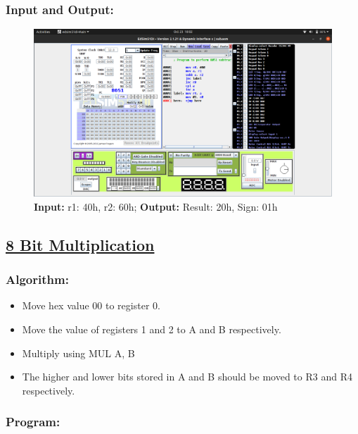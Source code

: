 \documentclass[12pt,a4paper]{article}
\begin{document}
\begin{flushleft}
\subsubsection*{\textbf{Input and Output:}}
\begin{figure}[h]
    \centering
    \includegraphics[trim = 60mm 75mm 60mm 10mm, clip, width = \textwidth]{Pics/Sub.png}
    \caption{ \textbf{Input:} r1: 40h, r2: 60h; 
              \textbf{Output:} Result: 20h, Sign: 01h}
\end{figure}
\newpage
\subsection*{\textbf{\underline{8 Bit Multiplication}}}

\subsubsection*{\textbf{Algorithm:}}
\begin{itemize}
    \item Move hex value 00 to register 0. 
    \item Move the value of registers 1 and 2 to A and B respectively.
    \item Multiply using MUL A, B
    \item The higher and lower bits stored in A and B should be moved to R3 and R4 respectively.
\end{itemize}

\newpage
\subsubsection*{\textbf{Program:}}


\end{flushleft}
\end{document}
